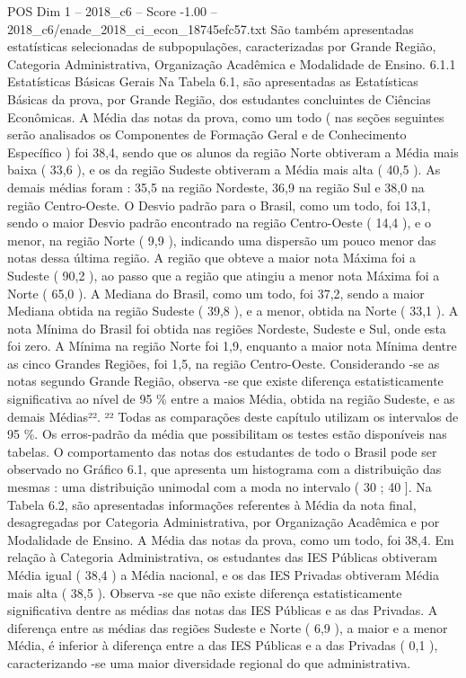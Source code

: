 \begin{textsample}{POS Dim 1 – 2018\_c6 – Score -1.00 – 2018\_c6/enade\_2018\_ci\_econ\_18745efc57.txt}
São também apresentadas estatísticas selecionadas de subpopulações, caracterizadas por Grande Região, Categoria Administrativa, Organização Acadêmica e Modalidade de Ensino. 6.1.1 Estatísticas Básicas Gerais Na Tabela 6.1, são apresentadas as Estatísticas Básicas da prova, por Grande Região, dos estudantes concluintes de Ciências Econômicas.
A Média das notas da prova, como um todo ( nas seções seguintes serão analisados os Componentes de Formação Geral e de Conhecimento Específico ) foi 38,4, sendo que os alunos da região Norte obtiveram a Média mais baixa ( 33,6 ), e os da região Sudeste obtiveram a Média mais alta ( 40,5 ).
As demais médias foram : 35,5 na região Nordeste, 36,9 na região Sul e 38,0 na região Centro-Oeste.
O Desvio padrão para o Brasil, como um todo, foi 13,1, sendo o maior Desvio padrão encontrado na região Centro-Oeste ( 14,4 ), e o menor, na região Norte ( 9,9 ), indicando uma dispersão um pouco menor das notas dessa última região.
A região que obteve a maior nota Máxima foi a Sudeste ( 90,2 ), ao passo que a região que atingiu a menor nota Máxima foi a Norte ( 65,0 ).
A Mediana do Brasil, como um todo, foi 37,2, sendo a maior Mediana obtida na região Sudeste ( 39,8 ), e a menor, obtida na Norte ( 33,1 ).
A nota Mínima do Brasil foi obtida nas regiões Nordeste, Sudeste e Sul, onde esta foi zero.
A Mínima na região Norte foi 1,9, enquanto a maior nota Mínima dentre as cinco Grandes Regiões, foi 1,5, na região Centro-Oeste.
Considerando -se as notas segundo Grande Região, observa -se que existe diferença estatisticamente significativa ao nível de 95 \% entre a maios Média, obtida na região Sudeste, e as demais Médias²². ²² Todas as comparações deste capítulo utilizam os intervalos de 95 \%.
Os erros-padrão da média que possibilitam os testes estão disponíveis nas tabelas.
O comportamento das notas dos estudantes de todo o Brasil pode ser observado no Gráfico 6.1, que apresenta um histograma com a distribuição das mesmas : uma distribuição unimodal com a moda no intervalo ( 30 ; 40 ].
Na Tabela 6.2, são apresentadas informações referentes à Média da nota final, desagregadas por Categoria Administrativa, por Organização Acadêmica e por Modalidade de Ensino.
A Média das notas da prova, como um todo, foi 38,4.
Em relação à Categoria Administrativa, os estudantes das IES Públicas obtiveram Média igual ( 38,4 ) a Média nacional, e os das IES Privadas obtiveram Média mais alta ( 38,5 ).
Observa -se que não existe diferença estatisticamente significativa dentre as médias das notas das IES Públicas e as das Privadas.
A diferença entre as médias das regiões Sudeste e Norte ( 6,9 ), a maior e a menor Média, é inferior à diferença entre a das IES Públicas e a das Privadas ( 0,1 ), caracterizando -se uma maior diversidade regional do que administrativa.

\end{textsample}
